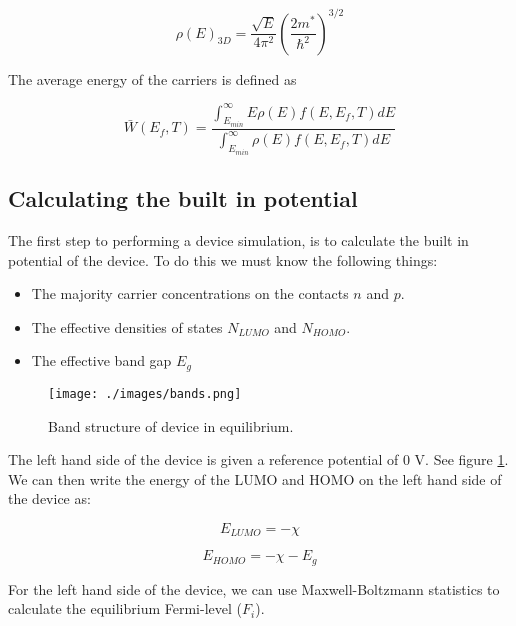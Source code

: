 \begin{equation}
\rho(E)_{3D}=\frac{\sqrt{E}}{4\pi^2} \left ( \frac{2m^{*}}{\hbar^2}\right )^{3/2}
\end{equation}

The average energy of the carriers is defined as

\begin{equation}
\bar{W}(E_{f},T)=\frac{\int^{\infty}_{E_{min}} E \rho(E) f(E,E_{f},T) dE}{\int^{\infty}_{E_{min}} \rho(E) f(E,E_{f},T) dE}
\end{equation}



\subsection{Calculating the built in potential}  \label{sssec:initial}
The first step to performing a device simulation, is to calculate the built in potential of the device.  To do this we must know the following things:

\begin{itemize}

  \item The majority carrier concentrations on the contacts $n$ and $p$.
  \item The effective densities of states $N_{LUMO}$ and $N_{HOMO}$.
  \item The effective band gap $E_g$

\end{itemize}

\begin{figure}[ht!]
\centering
\texttt{[image: ./images/bands.png]}
\caption{Band structure of device in equilibrium.}
\label{fig:bands}
\end{figure}

\vspace{1em}
The left hand side of the device is given a reference potential of 0 V.  See figure \ref{fig:bands}.  We can then write the energy of the LUMO and HOMO on the left hand side of the device as:

\begin{equation}
E_{LUMO}=-\chi
\end{equation}

\begin{equation}
E_{HOMO}=-\chi-E_{g}
\end{equation}

For the left hand side of the device, we can use Maxwell-Boltzmann statistics to calculate the equilibrium Fermi-level ($F_i$).

